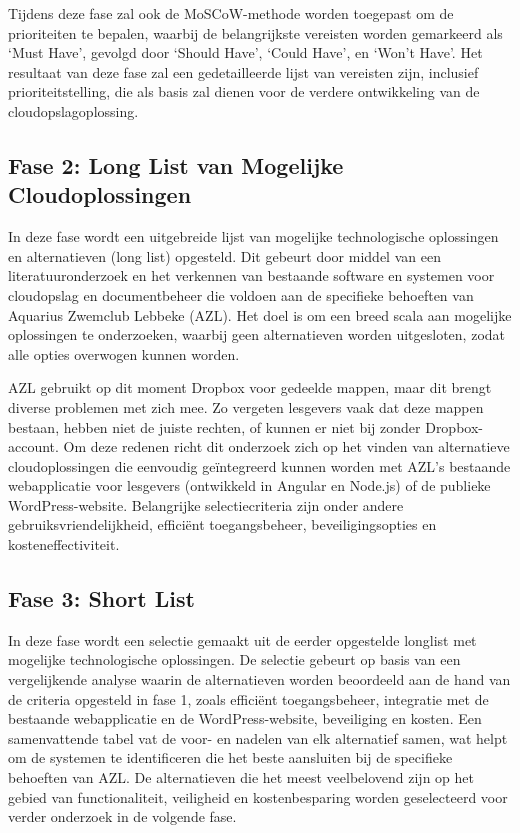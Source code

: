 Tijdens deze fase zal ook de MoSCoW-methode worden toegepast om de prioriteiten te bepalen, waarbij de belangrijkste vereisten worden gemarkeerd als ‘Must Have’, gevolgd door ‘Should Have’, ‘Could Have’, en ‘Won’t Have’. Het resultaat van deze fase zal een gedetailleerde lijst van vereisten zijn, inclusief prioriteitstelling, die als basis zal dienen voor de verdere ontwikkeling van de cloudopslagoplossing.

\subsection{Fase 2: Long List van Mogelijke Cloudoplossingen}
In deze fase wordt een uitgebreide lijst van mogelijke technologische oplossingen en alternatieven (long list) opgesteld. Dit gebeurt door middel van een literatuuronderzoek en het verkennen van bestaande software en systemen voor cloudopslag en documentbeheer die voldoen aan de specifieke behoeften van Aquarius Zwemclub Lebbeke (AZL). Het doel is om een breed scala aan mogelijke oplossingen te onderzoeken, waarbij geen alternatieven worden uitgesloten, zodat alle opties overwogen kunnen worden.

AZL gebruikt op dit moment Dropbox voor gedeelde mappen, maar dit brengt diverse problemen met zich mee. Zo vergeten lesgevers vaak dat deze mappen bestaan, hebben niet de juiste rechten, of kunnen er niet bij zonder Dropbox-account. Om deze redenen richt dit onderzoek zich op het vinden van alternatieve cloudoplossingen die eenvoudig geïntegreerd kunnen worden met AZL’s bestaande webapplicatie voor lesgevers (ontwikkeld in Angular en Node.js) of de publieke WordPress-website. Belangrijke selectiecriteria zijn onder andere gebruiksvriendelijkheid, efficiënt toegangsbeheer, beveiligingsopties en kosteneffectiviteit.
\subsection{Fase 3: Short List}
In deze fase wordt een selectie gemaakt uit de eerder opgestelde longlist met mogelijke technologische oplossingen. De selectie gebeurt op basis van een vergelijkende analyse waarin de alternatieven worden beoordeeld aan de hand van de criteria opgesteld in fase 1, zoals efficiënt toegangsbeheer, integratie met de bestaande webapplicatie en de WordPress-website, beveiliging en kosten. Een samenvattende tabel vat de voor- en nadelen van elk alternatief samen, wat helpt om de systemen te identificeren die het beste aansluiten bij de specifieke behoeften van AZL. De alternatieven die het meest veelbelovend zijn op het gebied van functionaliteit, veiligheid en kostenbesparing worden geselecteerd voor verder onderzoek in de volgende fase.
